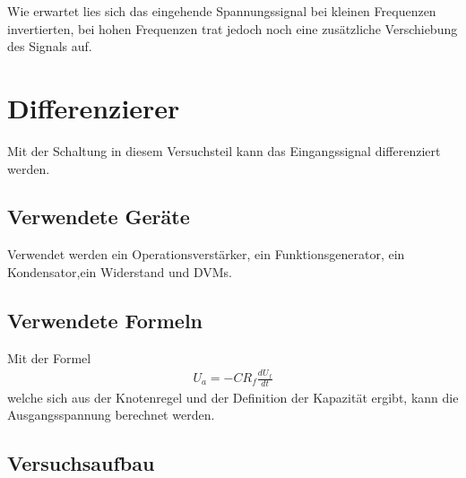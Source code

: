 \documentclass[12pt,a4paper]{article}
\begin{document}
Wie erwartet lies sich das eingehende Spannungssignal bei kleinen Frequenzen invertierten, bei hohen Frequenzen trat jedoch noch eine zusätzliche Verschiebung des Signals auf.

\section{Differenzierer}
Mit der Schaltung in diesem Versuchsteil kann das Eingangssignal differenziert werden.
\subsection{Verwendete Geräte}

Verwendet werden ein Operationsverstärker, ein Funktionsgenerator, ein Kondensator,ein Widerstand und DVMs.

\subsection{Verwendete Formeln}
Mit der Formel
\begin{align}
U_a = -CR_f\frac{dU_f}{dt}
\end{align}
welche sich aus der Knotenregel und der Definition der Kapazität ergibt, kann die Ausgangsspannung berechnet werden.
\subsection{Versuchsaufbau}
\end{document}
